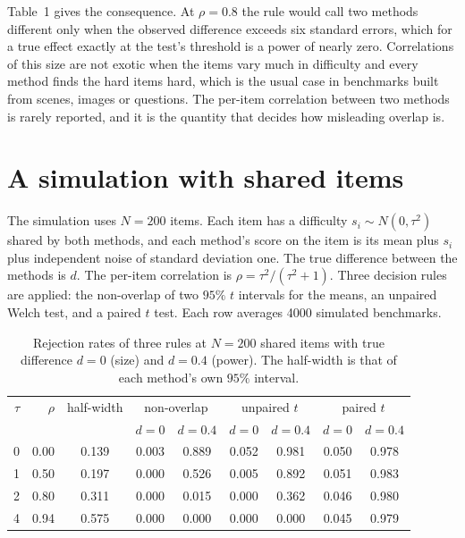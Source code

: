 \documentclass[11pt]{article}
\theoremstyle{definition}
\begin{document}
Table~1 gives the consequence. At $\rho=0.8$ the rule would call two methods different only when the observed difference exceeds six standard errors, which for a true effect exactly at the test's threshold is a power of nearly zero. Correlations of this size are not exotic when the items vary much in difficulty and every method finds the hard items hard, which is the usual case in benchmarks built from scenes, images or questions. The per-item correlation between two methods is rarely reported, and it is the quantity that decides how misleading overlap is.

\section{A simulation with shared items}

The simulation uses $N=200$ items. Each item has a difficulty $s_i\sim N(0,\tau^2)$ shared by both methods, and each method's score on the item is its mean plus $s_i$ plus independent noise of standard deviation one. The true difference between the methods is $d$. The per-item correlation is $\rho=\tau^2/(\tau^2+1)$. Three decision rules are applied: the non-overlap of two $95\%$ $t$ intervals for the means, an unpaired Welch test, and a paired $t$ test. Each row averages 4000 simulated benchmarks.

\begin{table}[t]
\centering
\caption{Rejection rates of three rules at $N=200$ shared items with true difference $d=0$ (size) and $d=0.4$ (power). The half-width is that of each method's own $95\%$ interval.}
\begin{tabular}{rrccccccc}
\toprule
$\tau$ & $\rho$ & half-width & \multicolumn{2}{c}{non-overlap} & \multicolumn{2}{c}{unpaired $t$} & \multicolumn{2}{c}{paired $t$} \\
 & & & $d=0$ & $d=0.4$ & $d=0$ & $d=0.4$ & $d=0$ & $d=0.4$ \\
\midrule
0 & 0.00 & 0.139 & 0.003 & 0.889 & 0.052 & 0.981 & 0.050 & 0.978 \\
1 & 0.50 & 0.197 & 0.000 & 0.526 & 0.005 & 0.892 & 0.051 & 0.983 \\
2 & 0.80 & 0.311 & 0.000 & 0.015 & 0.000 & 0.362 & 0.046 & 0.980 \\
4 & 0.94 & 0.575 & 0.000 & 0.000 & 0.000 & 0.000 & 0.045 & 0.979 \\
\bottomrule
\end{tabular}
\end{table}
\end{document}
